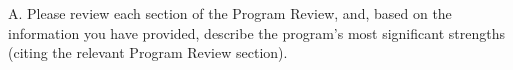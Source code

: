 A. Please review each section of the Program Review, and, based on the information you have provided, describe the program’s most significant strengths (citing the relevant Program Review section).
